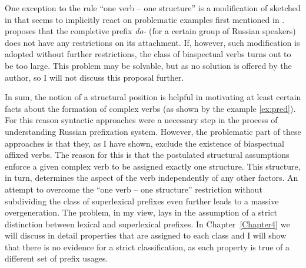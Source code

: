 One exception to the rule ``one verb -- one structure'' is a modification of \citet{Tatevosov:09} sketched in \citet{Tatevosov:13} that seems to implicitly react on problematic examples first mentioned in \citet{Zinova:12}. \citet{Tatevosov:13} proposes that the completive prefix \textit{do-} (for a certain group of Russian speakers) does not have any restrictions on its attachment. If, however, such modification is adopted without further restrictions, the class of biaspectual verbs turns out to be too large. This problem may be solvable, but as no solution is offered by the author, so I will not discuss this proposal further.

%
In sum, the notion of a structural position is helpful in motivating at least certain facts about the formation of complex verbs (as shown by the example \ref{ex:pred}). For this reason syntactic approaches were a necessary step in the process of understanding Russian prefixation system. However, the problematic part of these approaches is that they, as I have shown, exclude the existence of biaspectual affixed verbs. The reason for this is that the postulated structural assumptions enforce a given complex verb to be assigned exactly one structure. This structure, in turn, determines the aspect of the verb independently of any other factors. An attempt to overcome the ``one verb -- one structure'' restriction without subdividing the class of superlexical prefixes even further  \citep{Tatevosov:13} leads to a massive overgeneration. The problem, in my view, lays in the assumption of a strict distinction between lexical and superlexical prefixes. In Chapter~\ref{Chapter4} we will discuss in detail properties that are assigned to each class and I will show that there is no evidence for a strict classification, as each property is true of a different set of prefix usages.

